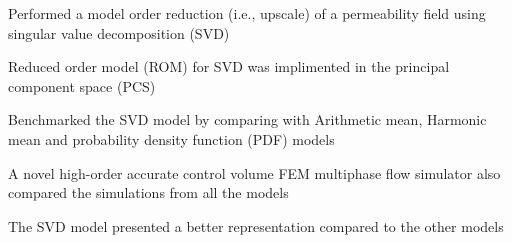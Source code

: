 Performed a model order reduction (i.e., upscale) of a permeability field using singular value decomposition (SVD)

Reduced order model (ROM) for SVD was implimented in the principal component space (PCS)

Benchmarked the SVD model by comparing with Arithmetic mean, Harmonic mean and probability density function (PDF) models

A novel high-order accurate control volume FEM multiphase flow simulator also compared the simulations from all the models

The SVD model presented a better representation compared to the other models 
